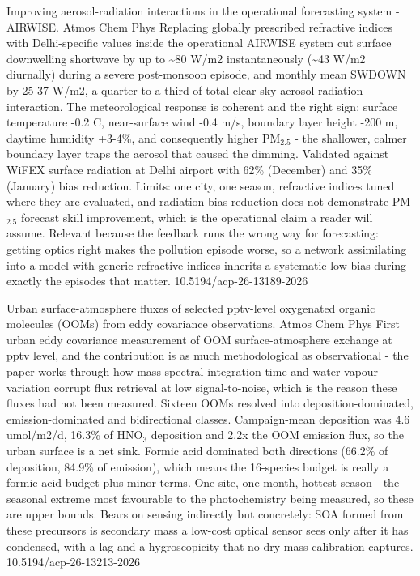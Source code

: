 \documentclass[10pt]{article}
\begin{document}
{Improving aerosol-radiation interactions in the operational forecasting system - AIRWISE.}
{Atmos Chem Phys}
{Replacing globally prescribed refractive indices with Delhi-specific values inside the operational AIRWISE system cut surface downwelling shortwave by up to \textasciitilde{}80 W/m2 instantaneously (\textasciitilde{}43 W/m2 diurnally) during a severe post-monsoon episode, and monthly mean SWDOWN by 25-37 W/m2, a quarter to a third of total clear-sky aerosol-radiation interaction. The meteorological response is coherent and the right sign: surface temperature -0.2 C, near-surface wind -0.4 m/s, boundary layer height -200 m, daytime humidity +3-4\%, and consequently higher PM$_{2.5}$ - the shallower, calmer boundary layer traps the aerosol that caused the dimming. Validated against WiFEX surface radiation at Delhi airport with 62\% (December) and 35\% (January) bias reduction. Limits: one city, one season, refractive indices tuned where they are evaluated, and radiation bias reduction does not demonstrate PM$_{2.5}$ forecast skill improvement, which is the operational claim a reader will assume. Relevant because the feedback runs the wrong way for forecasting: getting optics right makes the pollution episode worse, so a network assimilating into a model with generic refractive indices inherits a systematic low bias during exactly the episodes that matter.}
{10.5194/acp-26-13189-2026}

{Urban surface-atmosphere fluxes of selected pptv-level oxygenated organic molecules (OOMs) from eddy covariance observations.}
{Atmos Chem Phys}
{First urban eddy covariance measurement of OOM surface-atmosphere exchange at pptv level, and the contribution is as much methodological as observational - the paper works through how mass spectral integration time and water vapour variation corrupt flux retrieval at low signal-to-noise, which is the reason these fluxes had not been measured. Sixteen OOMs resolved into deposition-dominated, emission-dominated and bidirectional classes. Campaign-mean deposition was 4.6 umol/m2/d, 16.3\% of HNO$_3$ deposition and 2.2x the OOM emission flux, so the urban surface is a net sink. Formic acid dominated both directions (66.2\% of deposition, 84.9\% of emission), which means the 16-species budget is really a formic acid budget plus minor terms. One site, one month, hottest season - the seasonal extreme most favourable to the photochemistry being measured, so these are upper bounds. Bears on sensing indirectly but concretely: SOA formed from these precursors is secondary mass a low-cost optical sensor sees only after it has condensed, with a lag and a hygroscopicity that no dry-mass calibration captures.}
{10.5194/acp-26-13213-2026}
\end{document}

